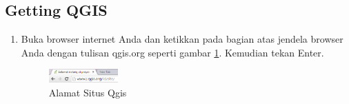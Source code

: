 \subsection{Getting QGIS}
\begin{enumerate}
\item
Buka browser internet Anda dan ketikkan pada bagian atas jendela browser Anda dengan tulisan qgis.org seperti gambar \ref{image1}. Kemudian tekan Enter.
\begin{figure}[ht]
        \centerline{\includegraphics[width=0.25\textwidth]{figures/image1}}
        \caption{Alamat Situs Qgis}
        \label{image1}
        \end{figure}


\end{enumerate}
